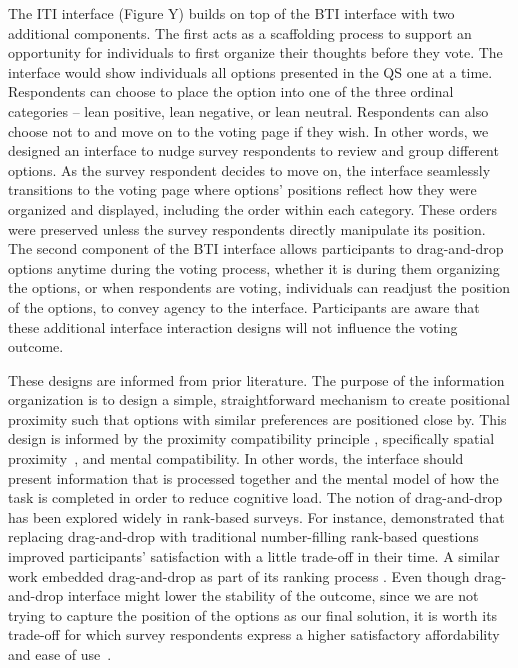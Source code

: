 The ITI interface (Figure Y) builds on top of the BTI interface with two additional components. The first acts as a scaffolding process to support an opportunity for individuals to first organize their thoughts before they vote. The interface would show individuals all options presented in the QS one at a time. Respondents can choose to place the option into one of the three ordinal categories -- lean positive, lean negative, or lean neutral. Respondents can also choose not to and move on to the voting page if they wish. In other words, we designed an interface to nudge survey respondents to review and group different options. As the survey respondent decides to move on, the interface seamlessly transitions to the voting page where options' positions reflect how they were organized and displayed, including the order within each category. These orders were preserved unless the survey respondents directly manipulate its position. The second component of the BTI interface allows participants to drag-and-drop options anytime during the voting process, whether it is during them organizing the options, or when respondents are voting, individuals can readjust the position of the options, to convey agency to the interface. Participants are aware that these additional interface interaction designs will not influence the voting outcome.

These designs are informed from prior literature. The purpose of the information organization is to design a simple, straightforward mechanism to create positional proximity such that options with similar preferences are positioned close by. This design is informed by the proximity compatibility principle \cite{wickens1995proximity}, specifically spatial proximity~\cite{wickens1990proximity}, and mental compatibility. In other words, the interface should present information that is processed together and the mental model of how the task is completed in order to reduce cognitive load. The notion of drag-and-drop has been explored widely in rank-based surveys. For instance, \textcite{krosnick2018measurement} demonstrated that replacing drag-and-drop with traditional number-filling rank-based questions improved participants' satisfaction with a little trade-off in their time. A similar work embedded drag-and-drop as part of its ranking process \cite{timbrook2013comparison}. Even though drag-and-drop interface might lower the stability of the outcome, since we are not trying to capture the position of the options as our final solution, it is worth its trade-off for which survey respondents express a higher satisfactory affordability and ease of use~\cite{rintoulVisualAnimatedResponse}.

